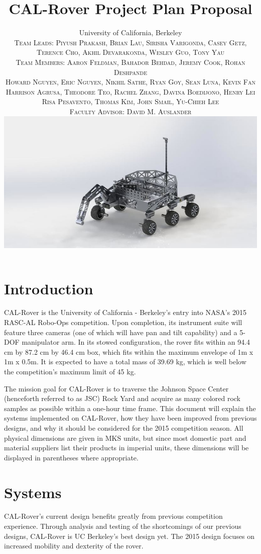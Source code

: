 \documentclass[titlepage,twocolumn,10pt]{article}
\title{\vspace{-15mm}\fontsize{24pt}{10pt}\selectfont\textbf{CAL-Rover Project Plan Proposal}} %
\author{
    \large University of California, Berkeley \\ %
    [5mm]
    \normalsize \textsc{Team Leads: Piyush Prakash, Brian Lau, Sirisha Varigonda, Casey Getz,}\\[0mm]
    \normalsize \textsc{Terence Cho, Akhil Devarakonda, Wesley Guo, Tony Yau}\\[3mm]
    \normalsize \textsc{Team Members: Aaron Feldman, Bahador Behdad, Jeremy Cook, Rohan Deshpande}\\[0mm]
    \normalsize \textsc{Howard Nguyen, Eric Nguyen, Nikhil Sathe, Ryan Goy, Sean Luna, Kevin Fan}\\[0mm]
    \normalsize \textsc{Harrison Agrusa, Theodore Teo, Rachel Zhang, Davina Boedijono, Henry Lei}\\[0mm]
    \normalsize \textsc{Risa Pesavento, Thomas Kim, John Smail, Yu-Chieh Lee}\\[3mm]
    \normalsize \textsc{Faculty Advisor: David M. Auslander}\\[6mm]
    \includegraphics*[width = \textwidth]{images/robot.png}
}
\begin{document}
\maketitle %

\thispagestyle{fancy} %







    \section{Introduction}
    CAL-Rover is the University of California - Berkeley's entry into NASA's 2015 RASC-AL Robo-Ops competition. Upon completion, its instrument suite will feature three cameras (one of which will have pan and tilt capability) and a 5-DOF manipulator arm. In its stowed configuration, the rover fits within an 94.4 cm by 87.2 cm by 46.4 cm box, which fits within the maximum envelope of 1m x 1m x 0.5m. It is expected to have a total mass of 39.69 kg, which is well below the competition's maximum limit of 45 kg.

    The mission goal for CAL-Rover is to traverse the Johnson Space Center (henceforth referred to as JSC) Rock Yard and acquire as many colored rock samples as possible within a one-hour time frame. This document will explain the systems implemented on CAL-Rover, how they have been improved from previous designs, and why it should be considered for the 2015 competition season. All physical dimensions are given in MKS units, but since most domestic part and material suppliers list their products in imperial units, these dimensions will be displayed in parentheses where appropriate.
    \section{Systems}
    CAL-Rover's current design benefits greatly from previous competition experience. Through analysis and testing of the shortcomings of our previous designs, CAL-Rover is UC Berkeley's best design yet. The 2015 design focuses on increased mobility and dexterity of the rover.
\end{document}
